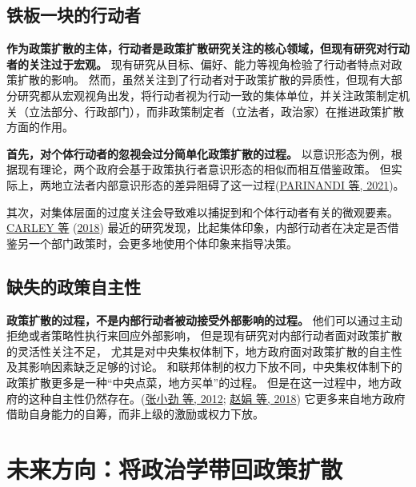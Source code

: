 \documentclass[
  12pt,
]{ctexart}
\begin{document}
\hypertarget{ux94c1ux677fux4e00ux5757ux7684ux884cux52a8ux8005}{%
\subsection{铁板一块的行动者}\label{ux94c1ux677fux4e00ux5757ux7684ux884cux52a8ux8005}}

\textbf{作为政策扩散的主体，行动者是政策扩散研究关注的核心领域，但现有研究对行动者的关注过于宏观。}
现有研究从目标、偏好、能力等视角检验了行动者特点对政策扩散的影响。
然而，虽然关注到了行动者对于政策扩散的异质性，但现有大部分研究都从宏观视角出发，将行动者视为行动一致的集体单位，并关注政策制定机关（立法部分、行政部门），而非政策制定者（立法者，政治家）在推进政策扩散方面的作用。

\textbf{首先，对个体行动者的忽视会过分简单化政策扩散的过程。}
以意识形态为例，根据现有理论，两个政府会基于政策执行者意识形态的相似而相互借鉴政策。
但实际上，两地立法者内部意识形态的差异阻碍了这一过程(\protect\hyperlink{ref-ParinandiEtAl2021}{PARINANDI 等, 2021})。

其次，对集体层面的过度关注会导致难以捕捉到和个体行动者有关的微观要素。
\protect\hyperlink{ref-CarleyNicholson-Crotty2018}{CARLEY 等} (\protect\hyperlink{ref-CarleyNicholson-Crotty2018}{2018}) 最近的研究发现，比起集体印象，内部行动者在决定是否借鉴另一个部门政策时，会更多地使用个体印象来指导决策。

\hypertarget{ux7f3aux5931ux7684ux653fux7b56ux81eaux4e3bux6027}{%
\subsection{缺失的政策自主性}\label{ux7f3aux5931ux7684ux653fux7b56ux81eaux4e3bux6027}}

\textbf{政策扩散的过程，不是内部行动者被动接受外部影响的过程。}
他们可以通过主动拒绝或者策略性执行来回应外部影响，
但是现有研究对内部行动者面对政策扩散的灵活性关注不足，
尤其是对中央集权体制下，地方政府面对政策扩散的自主性及其影响因素缺乏足够的讨论。
和联邦体制的权力下放不同，中央集权体制下的政策扩散更多是一种``中央点菜，地方买单''的过程。
但是在这一过程中，地方政府的这种自主性仍然存在。(\protect\hyperlink{ref-ZhangXiaoJingYuXiaoHong2012}{张小劲 等, 2012}; \protect\hyperlink{ref-ZhaoJuanMengTianGuang2018}{赵娟 等, 2018})
它更多来自地方政府借助自身能力的自筹，而非上级的激励或权力下放。

\newpage

\hypertarget{ux672aux6765ux65b9ux5411ux5c06ux653fux6cbbux5b66ux5e26ux56deux653fux7b56ux6269ux6563}{%
\section{未来方向：将政治学带回政策扩散}\label{ux672aux6765ux65b9ux5411ux5c06ux653fux6cbbux5b66ux5e26ux56deux653fux7b56ux6269ux6563}}
\end{document}
